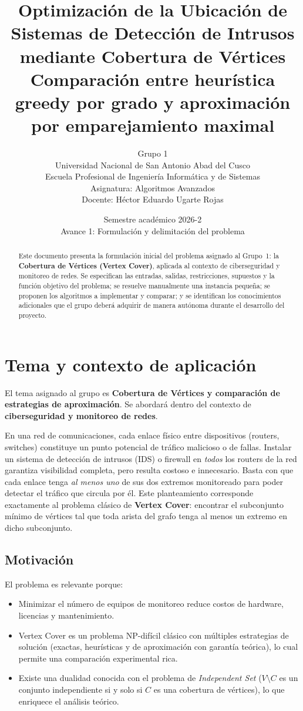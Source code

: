 \documentclass[11pt,a4paper]{article}
\title{
	\vspace{-1.5cm}
	\textbf{Optimización de la Ubicación de Sistemas de Detección de Intrusos \\
	mediante Cobertura de Vértices} \\
	\large Comparación entre heurística greedy por grado y aproximación por emparejamiento maximal
}
\author{
	Grupo 1 \\
	\small Universidad Nacional de San Antonio Abad del Cusco \\
	\small Escuela Profesional de Ingeniería Informática y de Sistemas \\
	\small Asignatura: Algoritmos Avanzados \\
	\small Docente: Héctor Eduardo Ugarte Rojas
}
\date{Semestre académico 2026-2 \\ Avance 1: Formulación y delimitación del problema}
\begin{document}
\maketitle
\thispagestyle{fancy}

\begin{abstract}
\noindent
Este documento presenta la formulación inicial del problema asignado al Grupo~1: la
\textbf{Cobertura de Vértices (Vertex Cover)}, aplicada al contexto de ciberseguridad y
monitoreo de redes. Se especifican las entradas, salidas, restricciones, supuestos y la
función objetivo del problema; se resuelve manualmente una instancia pequeña; se proponen
los algoritmos a implementar y comparar; y se identifican los conocimientos adicionales
que el grupo deberá adquirir de manera autónoma durante el desarrollo del proyecto.
\end{abstract}

\section{Tema y contexto de aplicación}

El tema asignado al grupo es \textbf{Cobertura de Vértices y comparación de estrategias
de aproximación}. Se abordará dentro del contexto de \textbf{ciberseguridad y monitoreo
de redes}.

En una red de comunicaciones, cada enlace físico entre dispositivos (routers, switches)
constituye un punto potencial de tráfico malicioso o de fallas. Instalar un sistema de
detección de intrusos (IDS) o firewall en \emph{todos} los routers de la red garantiza
visibilidad completa, pero resulta costoso e innecesario. Basta con que cada enlace tenga
\emph{al menos uno} de sus dos extremos monitoreado para poder detectar el tráfico que
circula por él. Este planteamiento corresponde exactamente al problema clásico de
\textbf{Vertex Cover}: encontrar el subconjunto mínimo de vértices tal que toda arista del
grafo tenga al menos un extremo en dicho subconjunto.

\subsection{Motivación}
El problema es relevante porque:
\begin{itemize}[itemsep=2pt]
	\item Minimizar el número de equipos de monitoreo reduce costos de hardware, licencias
	y mantenimiento.
	\item Vertex Cover es un problema NP-difícil clásico con múltiples estrategias de
	solución (exactas, heurísticas y de aproximación con garantía teórica), lo cual permite
	una comparación experimental rica.
	\item Existe una dualidad conocida con el problema de \emph{Independent Set}
	($V \setminus C$ es un conjunto independiente si y solo si $C$ es una cobertura de
	vértices), lo que enriquece el análisis teórico.
\end{itemize}
\end{document}
